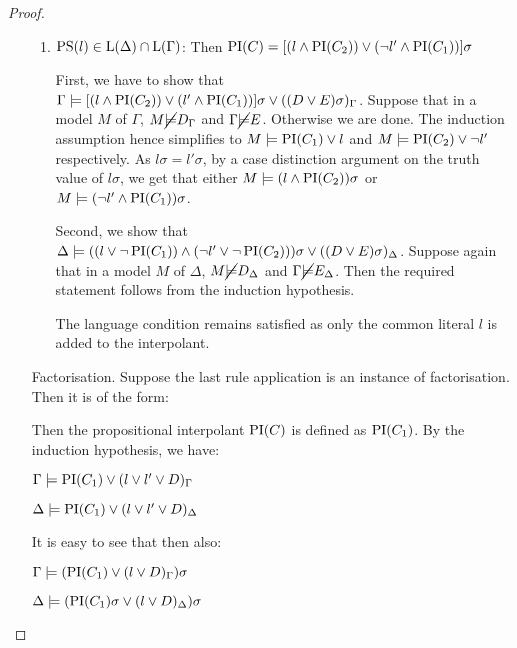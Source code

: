 \begin{proof}
\begin{itemize}
\begin{enumerate}
				\item $\operatorname{PS}(l) \in \operatorname{L}(\Delta) \cap \operatorname{L}(\Gamma)$:
					Then $\operatorname{PI}(C) = [(l \land \operatorname{PI}(C_2)) \lor (\lnot l' \land \operatorname{PI}(C_1)) ]\sigma $

					First, we have to show that 
					$ \Gamma \models [(l \land \operatorname{PI}(C_2)) \lor (l' \land \operatorname{PI}(C_1)) ]\sigma \lor ((D \lor E)\sigma)_\Gamma$.
					Suppose that in a model $M$ of $\Gamma$, $M \cancel {\models} D_\Gamma$ and $\Gamma \cancel {\models} E$. Otherwise we are done.
					The induction assumption hence simplifies to $M \models \operatorname{PI}(C_1) \lor l$ and $M \models \operatorname{PI}(C_2) \lor \lnot l'$ respectively.
					As $l\sigma = l'\sigma$, by a case distinction argument on the truth value of $l\sigma$, we get that either $M \models (l \land \operatorname{PI}(C_2))\sigma$ or $M \models  (\lnot l' \land \operatorname{PI}(C_1))\sigma$.


					Second, we show that 
					$\Delta \models ((l \lor \lnot \operatorname{PI}(C_1)) \land (\lnot l' \lor \lnot \operatorname{PI}(C_2)))\sigma \lor ((D \lor E)\sigma)_\Delta$.
					Suppose again that in a model $M$ of $\Delta$, $M \cancel {\models} D_\Delta$ and $\Gamma \cancel {\models} E_\Delta$. 
					Then the required statement follows from the induction hypothesis.
					
					The language condition remains satisfied as only the common literal $l$ is added to the interpolant.


			\end{enumerate}

		\item[Factorisation.]	
			Suppose the last rule application is an instance of factorisation. Then it is of the form:
			\begin{prooftree}
			\end{prooftree}

			Then the propositional interpolant $\operatorname{PI}(C)$ is defined as $\operatorname{PI}(C_1)$.
			By the induction hypothesis, we have:

			$\Gamma \models \operatorname{PI}(C_1) \lor (l \lor l' \lor D)_\Gamma$

			$\Delta \models \operatorname{PI}(C_1) \lor (l \lor l' \lor D)_\Delta$

			It is easy to see that then also:

			$\Gamma \models (\operatorname{PI}(C_1)\lor (l \lor D)_\Gamma)\sigma$

			$\Delta \models (\operatorname{PI}(C_1)\sigma \lor (l \lor D)_\Delta)\sigma$


\end{itemize}
\end{proof}
